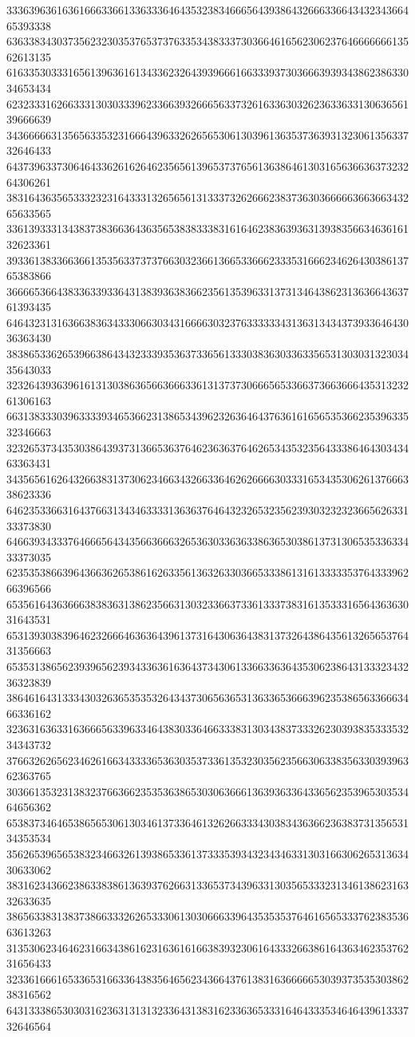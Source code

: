 33363963616361666336613363336464353238346665643938643266633664343234366465393338
63633834303735623230353765373763353438333730366461656230623764666666613562613135
61633530333165613963616134336232643939666166333937303666393934386238633034653434
62323331626633313030333962336639326665633732616336303262363363313063656139666639
34366666313565633532316664396332626565306130396136353736393132306135633732646433
64373963373064643362616264623565613965373765613638646130316563663637323264306261
38316436356533323231643331326565613133373262666238373630366666366366343265633565
33613933313438373836636436356538383338316164623836393631393835663463616132623361
39336138336636613535633737376630323661366533666233353166623462643038613765383866
36666536643833633933643138393638366235613539633137313464386231363664363761393435
64643231316366383634333066303431666630323763333334313631343437393364643036363430
38386533626539663864343233393536373365613330383630336335653130303132303435643033
32326439363961613130386365663666336131373730666565336637366366643531323261306163
66313833303963333934653662313865343962326364643763616165653536623539633532346663
32326537343530386439373136653637646236363764626534353235643338646430343463363431
34356561626432663831373062346634326633646262666630333165343530626137666338623336
64623533663164376631343463333136363764643232653235623930323232366562633133373830
64663934333764666564343566366632653630336363386365303861373130653533633433373035
62353538663964366362653861626335613632633036653338613161333335376433396266396566
65356164363666383836313862356631303233663733613337383161353331656436363031643531
65313930383964623266646363643961373164306364383137326438643561326565376431356663
65353138656239396562393433636163643734306133663363643530623864313332343236323839
38646164313334303263653535326434373065636531363365366639623538656336663466336162
32363163633163666563396334643830336466333831303438373332623039383533353234343732
37663262656234626166343333653630353733613532303562356630633835633039396362363765
30366135323138323766366235353638653030636661363936336433656235396530353464656362
65383734646538656530613034613733646132626633343038343636623638373135653134353534
35626539656538323466326139386533613733353934323434633130316630626531363430633062
38316234366238633838613639376266313365373439633130356533323134613862316332633635
38656338313837386633326265333061303066633964353535376461656533376238353663613263
31353062346462316634386162316361616638393230616433326638616436346235376231656433
32336166616533653166336438356465623436643761383163666665303937353530386238316562
64313338653030316236313131323364313831623363653331646433353464643961333732646564
